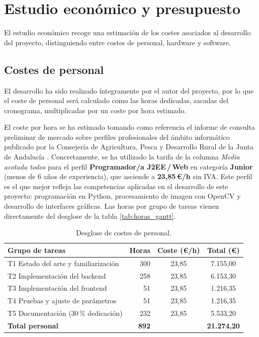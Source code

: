 \section{Estudio económico y presupuesto}

El estudio económico recoge una estimación de los costes asociados al desarrollo del proyecto, distinguiendo entre costes de personal, hardware y software.

\subsection{Costes de personal}

El desarrollo ha sido realizado íntegramente por el autor del proyecto, por lo que el coste de personal será calculado como las horas dedicadas, sacadas del cronograma, multiplicadas por un coste por hora estimado.

El coste por hora se ha estimado tomando como referencia el informe de consulta preliminar de mercado sobre perfiles profesionales del ámbito informático publicado por la Consejería de Agricultura, Pesca y Desarrollo Rural de la Junta de Andalucía \cite{junta2018precios}. Concretamente, se ha utilizado la tarifa de la columna \textit{Media acotada todos} para el perfil \textbf{Programador/a J2EE\,/\,Web} en categoría \textbf{Junior} (menos de 6 años de experiencia), que asciende a \textbf{23,85\,€/h} sin IVA. Este perfil es el que mejor refleja las competencias aplicadas en el desarrollo de este proyecto: programación en Python, procesamiento de imagen con OpenCV y desarrollo de interfaces gráficas. Las horas por grupo de tareas vienen directamente del desglose de la tabla \ref{tab:horas_gantt}.

\begin{table}[H]
\centering
\caption{Desglose de costes de personal.}
\begin{tabular}{lrcc}
\hline
\textbf{Grupo de tareas} & \textbf{Horas} & \textbf{Coste (€/h)} & \textbf{Total (€)} \\
\hline
T1 Estado del arte y familiarización & 300 & 23,85 & 7.155,00 \\
T2 Implementación del backend        & 258 & 23,85 & 6.153,30 \\
T3 Implementación del frontend       & 51  & 23,85 & 1.216,35 \\
T4 Pruebas y ajuste de parámetros    & 51  & 23,85 & 1.216,35 \\
T5 Documentación (30\,\% dedicación) & 232 & 23,85 & 5.533,20 \\
\hline
\textbf{Total personal} & \textbf{892} & & \textbf{21.274,20} \\
\hline
\end{tabular}
\label{tab:costes_personal}
\end{table}

